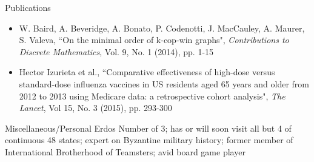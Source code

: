 \documentclass{resume} %
\begin{document}

\begin{rSection}{Publications}
\begin{itemize}
    \item W. Baird, A. Beveridge, A. Bonato, P. Codenotti, J. MacCauley, A. Maurer, S. Valeva, ``On the minimal order of k-cop-win graphs", {\em Contributions to Discrete Mathematics}, Vol. 9, No. 1 (2014), pp. 1-15 
    \item Hector Izurieta et al., ``Comparative effectiveness of high-dose versus standard-dose influenza vaccines in US residents aged 65 years and older from 2012 to 2013 using Medicare data: a retrospective cohort analysis", {\em The Lancet}, Vol 15, No. 3 (2015), pp. 293-300 
\end{itemize}
\end{rSection}


\begin{rSection}{Miscellaneous/Personal} 
    Erdos Number of 3; has or will soon visit all but 4 of continuous 48 states; expert on Byzantine military history; former member of International Brotherhood of Teamsters; avid board game player 
\end{rSection}






\end{document}
